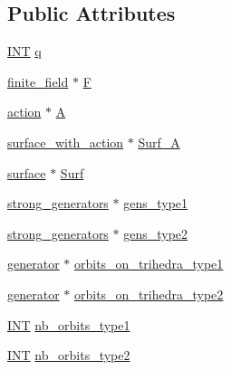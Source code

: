 \subsection*{Public Attributes}
\begin{DoxyCompactItemize}
\item 
\mbox{\hyperlink{galois_8h_a09fddde158a3a20bd2dcadb609de11dc}{I\+NT}} \mbox{\hyperlink{classclassify__trihedral__pairs_a7ed777abae1709097e9a89a3ddbedf85}{q}}
\item 
\mbox{\hyperlink{classfinite__field}{finite\+\_\+field}} $\ast$ \mbox{\hyperlink{classclassify__trihedral__pairs_a10b89c2a35f12d22e9869533b90b5b48}{F}}
\item 
\mbox{\hyperlink{classaction}{action}} $\ast$ \mbox{\hyperlink{classclassify__trihedral__pairs_a17ab7eeed975caa343a1ed35f3ad380f}{A}}
\item 
\mbox{\hyperlink{classsurface__with__action}{surface\+\_\+with\+\_\+action}} $\ast$ \mbox{\hyperlink{classclassify__trihedral__pairs_a87a7ed755070199fdf9fad47ae98dcbe}{Surf\+\_\+A}}
\item 
\mbox{\hyperlink{classsurface}{surface}} $\ast$ \mbox{\hyperlink{classclassify__trihedral__pairs_aa534e165562691e619c717f028a6cb3a}{Surf}}
\item 
\mbox{\hyperlink{classstrong__generators}{strong\+\_\+generators}} $\ast$ \mbox{\hyperlink{classclassify__trihedral__pairs_a6f2ea3a06090e267bb190d3f415e59b3}{gens\+\_\+type1}}
\item 
\mbox{\hyperlink{classstrong__generators}{strong\+\_\+generators}} $\ast$ \mbox{\hyperlink{classclassify__trihedral__pairs_ac8093fed70c464ba30b78cd946098a58}{gens\+\_\+type2}}
\item 
\mbox{\hyperlink{classgenerator}{generator}} $\ast$ \mbox{\hyperlink{classclassify__trihedral__pairs_a8be753bb55e2b0b0cb21c1b1fec9c234}{orbits\+\_\+on\+\_\+trihedra\+\_\+type1}}
\item 
\mbox{\hyperlink{classgenerator}{generator}} $\ast$ \mbox{\hyperlink{classclassify__trihedral__pairs_aec253683bd624a7187f0897d102fe97c}{orbits\+\_\+on\+\_\+trihedra\+\_\+type2}}
\item 
\mbox{\hyperlink{galois_8h_a09fddde158a3a20bd2dcadb609de11dc}{I\+NT}} \mbox{\hyperlink{classclassify__trihedral__pairs_abf6db9b883cf5d969dbe844e2e1481fb}{nb\+\_\+orbits\+\_\+type1}}
\item 
\mbox{\hyperlink{galois_8h_a09fddde158a3a20bd2dcadb609de11dc}{I\+NT}} \mbox{\hyperlink{classclassify__trihedral__pairs_adf5770312a3e2a40ea1ba36d7ecb4574}{nb\+\_\+orbits\+\_\+type2}}

\end{DoxyCompactItemize}
